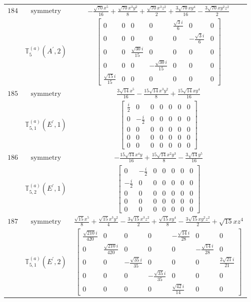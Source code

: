 \documentclass[fleqn,8pt,landscape]{jsarticle}
\begin{document}
\begin{longtable}{ccc}
$ 184 $ & $ \text{symmetry} $ & $ - \frac{\sqrt{70} x^{5}}{16} + \frac{\sqrt{70} x^{3} y^{2}}{8} + \frac{\sqrt{70} x^{3} z^{2}}{2} + \frac{3 \sqrt{70} x y^{4}}{16} - \frac{3 \sqrt{70} x y^{2} z^{2}}{2} $ \\
$  $ & $ \mathbb{T}_{5}^{(a)}(A^{\prime},2) $ & $ \begin{bmatrix} 0 & 0 & 0 & 0 & \frac{\sqrt{3} i}{6} & 0 & 0 \\ 0 & 0 & 0 & 0 & 0 & - \frac{\sqrt{3} i}{6} & 0 \\ 0 & 0 & \frac{\sqrt{30} i}{15} & 0 & 0 & 0 & 0 \\ 0 & 0 & 0 & - \frac{\sqrt{30} i}{15} & 0 & 0 & 0 \\ \frac{\sqrt{15} i}{15} & 0 & 0 & 0 & 0 & 0 & 0 \end{bmatrix} $ \\ \hline
$ 185 $ & $ \text{symmetry} $ & $ \frac{3 \sqrt{14} x^{5}}{16} - \frac{15 \sqrt{14} x^{3} y^{2}}{8} + \frac{15 \sqrt{14} x y^{4}}{16} $ \\
$  $ & $ \mathbb{T}_{5,1}^{(a)}(E^{\prime},1) $ & $ \begin{bmatrix} \frac{i}{2} & 0 & 0 & 0 & 0 & 0 & 0 \\ 0 & - \frac{i}{2} & 0 & 0 & 0 & 0 & 0 \\ 0 & 0 & 0 & 0 & 0 & 0 & 0 \\ 0 & 0 & 0 & 0 & 0 & 0 & 0 \\ 0 & 0 & 0 & 0 & 0 & 0 & 0 \end{bmatrix} $ \\ \hline
$ 186 $ & $ \text{symmetry} $ & $ - \frac{15 \sqrt{14} x^{4} y}{16} + \frac{15 \sqrt{14} x^{2} y^{3}}{8} - \frac{3 \sqrt{14} y^{5}}{16} $ \\
$  $ & $ \mathbb{T}_{5,2}^{(a)}(E^{\prime},1) $ & $ \begin{bmatrix} 0 & - \frac{i}{2} & 0 & 0 & 0 & 0 & 0 \\ - \frac{i}{2} & 0 & 0 & 0 & 0 & 0 & 0 \\ 0 & 0 & 0 & 0 & 0 & 0 & 0 \\ 0 & 0 & 0 & 0 & 0 & 0 & 0 \\ 0 & 0 & 0 & 0 & 0 & 0 & 0 \end{bmatrix} $ \\ \hline
$ 187 $ & $ \text{symmetry} $ & $ \frac{\sqrt{15} x^{5}}{8} + \frac{\sqrt{15} x^{3} y^{2}}{4} - \frac{3 \sqrt{15} x^{3} z^{2}}{2} + \frac{\sqrt{15} x y^{4}}{8} - \frac{3 \sqrt{15} x y^{2} z^{2}}{2} + \sqrt{15} x z^{4} $ \\
$  $ & $ \mathbb{T}_{5,1}^{(a)}(E^{\prime},2) $ & $ \begin{bmatrix} \frac{\sqrt{210} i}{420} & 0 & 0 & 0 & - \frac{\sqrt{14} i}{28} & 0 & 0 \\ 0 & \frac{\sqrt{210} i}{420} & 0 & 0 & 0 & - \frac{\sqrt{14} i}{28} & 0 \\ 0 & 0 & - \frac{\sqrt{35} i}{35} & 0 & 0 & 0 & \frac{2 \sqrt{21} i}{21} \\ 0 & 0 & 0 & - \frac{\sqrt{35} i}{35} & 0 & 0 & 0 \\ 0 & 0 & 0 & 0 & \frac{\sqrt{42} i}{14} & 0 & 0 \end{bmatrix} $ \\ \hline

\end{longtable}
\end{document}
